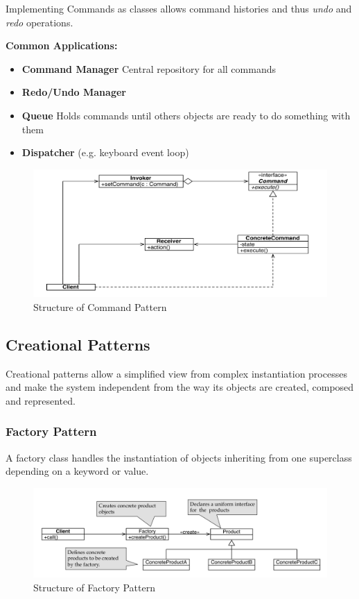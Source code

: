 Implementing Commands as classes allows command histories and thus \textit{undo} and \textit{redo} operations.\newline

\textbf{Common Applications:}
\begin{itemize}[topsep=5pt, itemsep=0pt]
  \item \textbf{Command Manager} Central repository for all commands
  \item \textbf{Redo/Undo Manager}
  \item \textbf{Queue} Holds commands until others objects are ready to do something with them
  \item \textbf{Dispatcher} (e.g. keyboard event loop)
\end{itemize}

\begin{figure}[h]
	\centering
	\includegraphics[width=\linewidth]{images/pattern_command.png}
	\caption{Structure of Command Pattern}
\end{figure}
\newpage


\subsection{Creational Patterns}
Creational patterns allow a simplified view from complex instantiation processes and make the system independent from the way its objects are created, composed and represented.

\subsubsection{Factory Pattern}
A factory class handles the instantiation of objects inheriting from one superclass depending on a keyword or value.
\begin{figure}[h]
	\centering
	\includegraphics[width=\linewidth]{images/pattern_factory.png}
	\caption{Structure of Factory Pattern}
\end{figure}
\newpage

